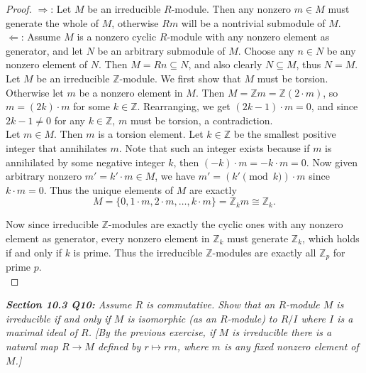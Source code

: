 \documentclass{article}
\begin{document}
  \begin{proof}
    $\Rightarrow$: Let $M$ be an irreducible $R$-module. Then any nonzero
    $m\in M$ must generate the whole of $M$, otherwise $Rm$ will be a
    nontrivial submodule of $M$. \\

    $\Leftarrow$: Assume $M$ is a nonzero cyclic $R$-module with any
    nonzero element as generator, and let $N$ be an arbitrary submodule of
    $M$. Choose any $n\in N$ be any nonzero element of $N$. Then
    $M=Rn\subseteq N$, and also clearly $N\subseteq M$, thus $N=M$. \\

    Let $M$ be an irreducible $\mathbb{Z}$-module. We first show that $M$
    must be torsion. Otherwise let $m$ be a nonzero element in $M$. Then
    $M=\mathbb{Z}m=\mathbb{Z}(2\cdot m)$, so $m=(2k)\cdot m$ for some
    $k\in\mathbb{Z}$. Rearranging, we get $(2k-1)\cdot m=0$, and since
    $2k-1\neq0$ for any $k\in\mathbb{Z}$, $m$ must be torsion, a
    contradiction. \\

    Let $m\in M$. Then $m$ is a torsion element.  Let $k\in\mathbb{Z}$ be
    the smallest positive integer that annihilates $m$. Note that such an
    integer exists because if $m$ is annihilated by some negative integer
    $k$, then $(-k)\cdot m=-k\cdot m=0$. Now given arbitrary nonzero
    $m'=k'\cdot m\in M$, we have $m'=(k'\pmod{k})\cdot m$ since $k\cdot
    m=0$. Thus the unique elements of $M$ are exactly
    \[M =\{0,1\cdot m,2\cdot m,\ldots,k\cdot m\} =\mathbb{Z}_km
    \cong\mathbb{Z}_k.\]

    Now since irreducible $\mathbb{Z}$-modules are exactly the cyclic ones
    with any nonzero element as generator, every nonzero element in
    $\mathbb{Z}_k$ must generate $\mathbb{Z}_k$, which holds if and only if
    $k$ is prime. Thus the irreducible $\mathbb{Z}$-modules are exactly all
    $\mathbb{Z}_p$ for prime $p$. \\
  \end{proof}

\it \textbf{Section 10.3 Q10:} Assume $R$ is commutative. Show that an
  $R$-module $M$ is irreducible if and only if $M$ is isomorphic (as an
  $R$-module) to $R/I$ where $I$ is a maximal ideal of $R$. [By the
  previous exercise, if $M$ is irreducible there is a natural map
  $R\rightarrow M$ defined by $r\mapsto rm$, where $m$ is any fixed nonzero
  element of $M$.]
\end{document}
